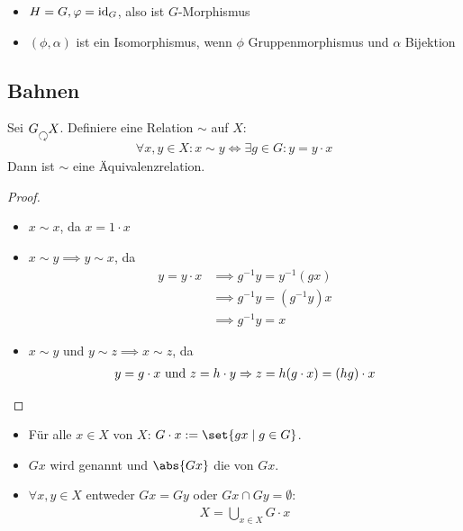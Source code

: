 \begin{definition}
	\begin{itemize}
		\item $H = G, \varphi = \operatorname{id}_G$, also ist $G$-Morphismus
		\item $(\phi, \alpha)$ ist ein Isomorphismus, wenn $\phi$ Gruppenmorphismus und $\alpha$ Bijektion
	\end{itemize}
\end{definition}
\subsection*{Bahnen}
\begin{lemma}
	Sei $G \Circlearrowleft X$. Definiere eine Relation $\sim$ auf $X$:
	\begin{align*}
		\forall x,y \in X \colon x \sim y \Leftrightarrow \exists g \in G\colon y = y \cdot x
	\end{align*}
	Dann ist $\sim$ eine Äquivalenzrelation.
\end{lemma}
\begin{proof}
	\begin{itemize}
		\item $x \sim x$, da $x = 1 \cdot x$
		\item $x \sim y \implies y \sim x$, da
		\begin{align*}
			y = y\cdot x &\implies g^{-1}y = y^{-1}(gx)\\
			&\implies g^{-1}y = (g^{-1}y)x\\
			& \implies g^{-1}y = x
		\end{align*}
		\item $x \sim y$ und $y \sim z \implies x \sim z$, da
		\begin{align*}
			y = g\cdot x \text{ und } z = h \cdot y \Rightarrow z = h(g\cdot x) = (hg)\cdot x
		\end{align*}
	\end{itemize}
\end{proof}
\begin{definition}
	\begin{itemize}
		\item Für alle $x \in X$  von $X$: $G\cdot x := \set{gx \mid g \in G}$.
		\item $Gx$ wird  genannt und $\abs{Gx}$ die  von $Gx$.
		\item $\forall x,y \in X$ entweder $Gx = Gy$ oder $Gx \cap Gy = \emptyset$:
		\begin{align*}
			X = \bigcup_{x \in X}G \cdot x
		\end{align*}
	\end{itemize}
\end{definition}
